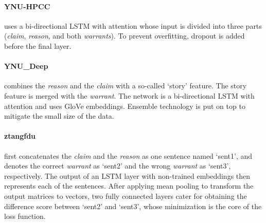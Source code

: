 \paragraph{YNU-HPCC}
uses a bi-directional LSTM with attention whose input is divided into three parts (\emph{claim}, \emph{reason}, and both \emph{warrants}). To prevent overfitting, dropout is added before the final layer.


\paragraph{YNU\_Deep}
combines the \emph{reason} and the \emph{claim} with a so-called `story' feature. The story feature is merged with the \emph{warrant}. The network is a bi-directional LSTM with attention and uses GloVe embeddings. Ensemble technology is put on top to mitigate the small size of the data.


\paragraph{ztangfdu}
first concatenates the \emph{claim} and the \emph{reason} as one sentence named `sent1', and denotes the correct \emph{warrant} as `sent2' and the wrong \emph{warrant} as `sent3', respectively. The output of an LSTM layer with non-trained embeddings then represents each of the sentences. After applying mean pooling to transform the output matrices to vectors, two fully connected layers cater for obtaining the difference score between `sent2' and `sent3', whose minimization is the core of the loss function.

